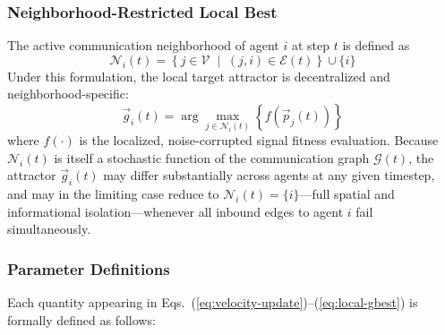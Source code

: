 \documentclass[journal]{IEEEtran}
\begin{document}
\subsubsection{Neighborhood-Restricted Local Best}
\label{sec:local-best}

The active communication neighborhood of agent $i$ at step $t$ is defined as
\begin{equation}
\mathcal{N}_i(t) = \left\{ j \in \mathcal{V} \;\middle|\; (j,i) \in \mathcal{E}(t) \right\} \cup \{i\}
\label{eq:neighborhood}
\end{equation}
Under this formulation, the local target attractor is decentralized and neighborhood-specific:
\begin{equation}
\vec{g}_i(t) = \arg\max_{j \in \mathcal{N}_i(t)} \left\{ f\left(\vec{p}_j(t)\right) \right\}
\label{eq:local-gbest}
\end{equation}
where $f(\cdot)$ is the localized, noise-corrupted signal fitness evaluation. Because $\mathcal{N}_i(t)$ is itself a stochastic function of the communication graph $\mathcal{G}(t)$, the attractor $\vec{g}_i(t)$ may differ substantially across agents at any given timestep, and may in the limiting case reduce to $\mathcal{N}_i(t) = \{i\}$---full spatial and informational isolation---whenever all inbound edges to agent $i$ fail simultaneously.

\subsubsection{Parameter Definitions}
\label{sec:param-defs}

Each quantity appearing in Eqs.~(\ref{eq:velocity-update})--(\ref{eq:local-gbest}) is formally defined as follows:
\end{document}
